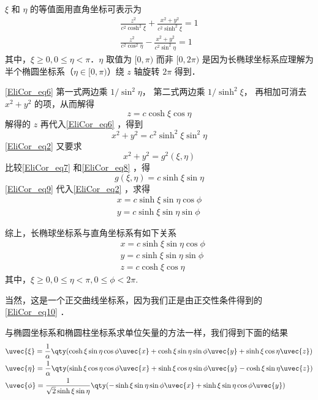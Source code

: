 $\xi$ 和 $\eta$ 的等值面用直角坐标可表示为
\begin{equation}\label{EliCor_eq6}
\begin{aligned}
\frac{z^2}{c^2\cosh^2\xi}+\frac{x^2+y^2}{c^2\sinh^2\xi}=1\\
\frac{z^2}{c^2\cos^2\eta}-\frac{x^2+y^2}{c^2\sin^2\eta}=1
\end{aligned}
\end{equation}
其中，$\xi\geq 0,0\leq\eta<\pi$．$\eta$ 取值为 $[0,\pi)$ 而非 $[0,2\pi)$ 是因为长椭球坐标系应理解为半个椭圆坐标系（$\eta\in[0,\pi)$）绕 $z$ 轴旋转 $2\pi$ 得到．

\autoref{EliCor_eq6} 第一式两边乘 $1/\sin^2\eta$， 第二式两边乘 $1/\sinh^2\xi$， 再相加可消去 $x^2+y^2$ 的项，从而解得
\begin{equation}
z=c\cosh\xi\cos\eta
\end{equation}
解得的 $z$ 再代入\autoref{EliCor_eq6} ，得到
\begin{equation}\label{EliCor_eq7}
x^2+y^2=c^2\sinh^2\xi\sin^2\eta
\end{equation}
\autoref{EliCor_eq2} 又要求
\begin{equation}\label{EliCor_eq8}
x^2+y^2=g^2(\xi,\eta)
\end{equation}
比较\autoref{EliCor_eq7} 和\autoref{EliCor_eq8} ，得
\begin{equation}\label{EliCor_eq9}
g(\xi,\eta)=c\sinh\xi\sin\eta
\end{equation}
\autoref{EliCor_eq9} 代入\autoref{EliCor_eq2} ，求得
\begin{equation}
\begin{aligned}
x=c\sinh\xi\sin\eta\cos\phi\\
y=c\sinh\xi\sin\eta\sin\phi
\end{aligned}
\end{equation}

综上，长椭球坐标系与直角坐标系有如下关系
\begin{equation}\label{EliCor_eq10}
\begin{aligned}
&x=c\sinh\xi\sin\eta\cos\phi\\
&y=c\sinh\xi\sin\eta\sin\phi\\
&z=c\cosh\xi\cos\eta
\end{aligned}
\end{equation}
其中，$\xi\geq 0,0\leq\eta<\pi,0\leq\phi<2\pi$.

当然，这是一个正交曲线坐标系，因为我们正是由正交性条件得到的\autoref{EliCor_eq10} ．

与椭圆坐标系和椭圆柱坐标系求单位矢量的方法一样，我们得到下面的结果
\begin{equation}
\begin{aligned}
&\uvec{\xi}=\frac{1}{\alpha}\qty(\cosh\xi\sin\eta\cos\phi\uvec{x}+\cosh\xi\sin\eta\sin\phi\uvec{y}+\sinh\xi\cos\eta\uvec{z})\\
&\uvec{\eta}=\frac{1}{\alpha}\qty(\sinh\xi\cos\eta\cos\phi\uvec{x}+\sinh\xi\cos\eta\sin\phi\uvec{y}-\cosh\xi\sin\eta\uvec{z})\\
&\uvec{\phi}=\frac{1}{\sqrt{2}\sinh\xi\sin\eta}\qty(-\sinh\xi\sin\eta\sin\phi\uvec{x}+\sinh\xi\sin\eta\cos\phi\uvec{y})
\end{aligned}
\end{equation}
